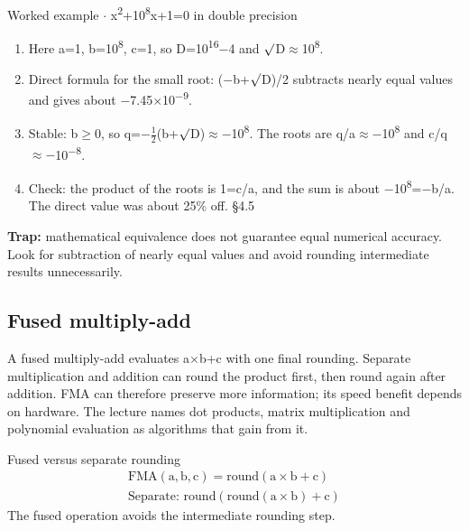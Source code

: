 \documentclass[11pt]{article}
\begin{document}
\begin{keepsection}
\begin{keepsection}
\begin{workedbox}{Worked example \ensuremath{\cdot} x\textsuperscript{2}+10\textsuperscript{8}x+1=0 in double precision}
\begin{enumerate}
\item Here a=1, b=10\textsuperscript{8}, c=1, so D=10\textsuperscript{16}\ensuremath{-}4 and \ensuremath{\surd}D\ensuremath{\approx}10\textsuperscript{8}.
\item Direct formula for the small root: (\ensuremath{-}b+\ensuremath{\surd}D)/2 subtracts nearly equal values and gives about \ensuremath{-}7.45\ensuremath{\times}10\textsuperscript{\ensuremath{-}9}.
\item Stable: b\ensuremath{\geq}0, so q=\ensuremath{-}\ensuremath{\tfrac12}(b+\ensuremath{\surd}D)\ensuremath{\approx}\ensuremath{-}10\textsuperscript{8}. The roots are q/a\ensuremath{\approx}\ensuremath{-}10\textsuperscript{8} and c/q\ensuremath{\approx}\ensuremath{-}10\textsuperscript{\ensuremath{-}8}.
\item Check: the product of the roots is 1=c/a, and the sum is about \ensuremath{-}10\textsuperscript{8}=\ensuremath{-}b/a. The direct value was about 25\% off. \hfill{\small\color{FAUblue}§4.5}
\end{enumerate}
\end{workedbox}

\begin{notebox}\textbf{Trap:} mathematical equivalence does not guarantee equal numerical accuracy. Look for subtraction of nearly equal values and avoid rounding intermediate results unnecessarily.\end{notebox}
\end{keepsection}

\begin{keepsection}
\subsection{Fused multiply-add}

A fused multiply-add evaluates a\ensuremath{\times}b+c with one final rounding. Separate multiplication and addition can round the product first, then round again after addition. FMA can therefore preserve more information; its speed benefit depends on hardware. The lecture names dot products, matrix multiplication and polynomial evaluation as algorithms that gain from it.

\begin{equationcard}{Fused versus separate rounding}
\[ \begin{gathered} \text{FMA}(\mathrm{a},\mathrm{b},\mathrm{c})=\text{round}(\mathrm{a}\times \mathrm{b}+\mathrm{c}) \\ \text{Separate}:\, \text{round}(\text{round}(\mathrm{a}\times \mathrm{b})+\mathrm{c}) \end{gathered} \]
{\small The fused operation avoids the intermediate rounding step.}
\end{equationcard}


\end{keepsection}
\end{keepsection}
\end{document}
